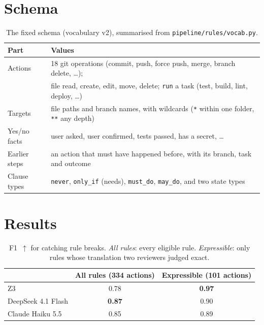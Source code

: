 \documentclass[11pt]{article}
\begin{document}



\appendix
\section{Schema}\label{app:schema}

\begin{table}[h!]
  \centering\small
  \begin{tabular}{@{}ll@{}}
    \toprule
    Part & Values \\
    \midrule
    Actions & 18 git operations (commit, push, force push, merge, branch delete, \ldots); \\
            & file read, create, edit, move, delete; \texttt{run} a task (test, build, lint, deploy, \ldots) \\
    Targets & file paths and branch names, with wildcards (\texttt{*} within one folder, \texttt{**} any depth) \\
    Yes/no facts & user asked, user confirmed, tests passed, has a secret, \ldots \\
    Earlier steps & an action that must have happened before, with its branch, task and outcome \\
    Clause types & \texttt{never}, \texttt{only\_if} (needs), \texttt{must\_do}, \texttt{may\_do}, and two state types \\
    \bottomrule
  \end{tabular}
  \caption{The fixed schema (vocabulary v2), summarised from \texttt{pipeline/rules/vocab.py}.}
  \label{tab:schema}
\end{table}

\section{Results}\label{app:results}

\begin{table}[h!]
  \centering\small
  \caption{F1~$\uparrow$ for catching rule breaks. \emph{All rules}: every eligible rule.
  \emph{Expressible}: only rules whose translation two reviewers judged exact.}
  \label{tab:f1}
  \begin{tabular}{@{}lcc@{}}
    \toprule
    & All rules (334 actions) & Expressible (101 actions) \\
    \midrule
    Z3 & 0.78 & \textbf{0.97} \\
    DeepSeek 4.1 Flash & \textbf{0.87} & 0.90 \\
    Claude Haiku 5.5 & 0.85 & 0.89 \\
    \bottomrule
  \end{tabular}
\end{table}
\end{document}
